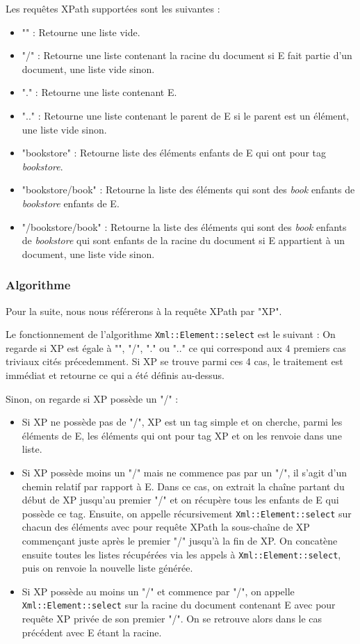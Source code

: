     Les requêtes XPath supportées sont les suivantes :
    \begin{itemize}
        \item "" : Retourne une liste vide.
        \item "/" : Retourne une liste contenant la racine du document si E fait partie d'un document, une liste vide sinon.
        \item "." : Retourne une liste contenant E.
        \item ".." : Retourne une liste contenant le parent de E si le parent est un élément, une liste vide sinon.
        \item "bookstore" : Retourne liste des éléments enfants de E qui ont pour tag \textit{bookstore}.
        \item "bookstore/book" : Retourne la liste des éléments qui sont des \textit{book} enfants de \textit{bookstore} enfants de E.
        \item "/bookstore/book" : Retourne la liste des éléments qui sont des \textit{book} enfants de \textit{bookstore} qui sont enfants de la racine du document si E appartient à un document, une liste vide sinon.
    \end{itemize}

    \subsubsection{Algorithme}

    Pour la suite, nous nous référerons à la requête XPath par "XP".

    Le fonctionnement de l'algorithme \lstinline$Xml::Element::select$ est le suivant :
    On regarde si XP est égale à "", "/", "." ou ".." ce qui correspond aux 4 premiers cas triviaux cités précedemment.
    Si XP se trouve parmi ces 4 cas, le traitement est immédiat et retourne ce qui a été définis au-dessus.

    Sinon, on regarde si XP possède un "/" :
    \begin{itemize}
        \item Si XP ne possède pas de "/", XP est un tag simple et on cherche, parmi les éléments de E, les éléments qui ont pour tag XP et on les renvoie dans une liste.
        \item Si XP possède moins un "/" mais ne commence pas par un "/", il s'agit d'un chemin relatif par rapport à E. Dans ce cas, on extrait la chaîne partant du début de XP jusqu'au premier "/" et on récupère tous les enfants de E qui possède ce tag. Ensuite, on appelle récursivement \lstinline$Xml::Element::select$ sur chacun des éléments avec pour requête XPath la sous-chaîne de XP commençant juste après le premier "/" jusqu'à la fin de XP. On concatène ensuite toutes les listes récupérées via les appels à \lstinline$Xml::Element::select$, puis on renvoie la nouvelle liste générée.
        \item Si XP possède au moins un "/" et commence par "/", on appelle \lstinline$Xml::Element::select$ sur la racine du document contenant E avec pour requête XP privée de son premier "/". On se retrouve alors dans le cas précédent avec E étant la racine.
    \end{itemize}

